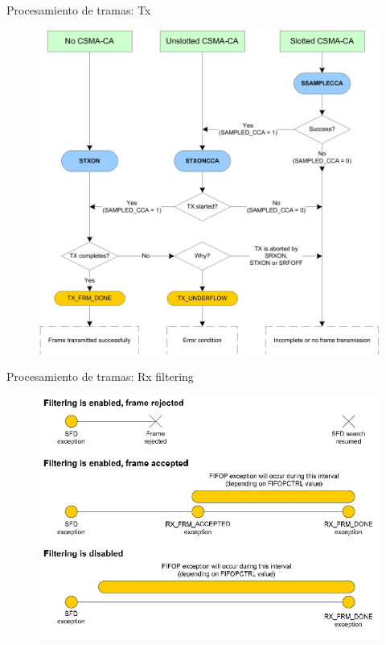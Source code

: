 \documentclass[aspectratio=169, handout]{beamer}
\begin{document}
\begin{frame}{Procesamiento de tramas: Tx}
	\begin{figure}[H]
		\includegraphics[height=.95\textheight]{./imagenes/txfifo.jpg}
	\end{figure}	
\end{frame}

\begin{frame}{Procesamiento de tramas: Rx filtering}
	\begin{figure}[H]
		\includegraphics[height=.95\textheight]{./imagenes/filtering.jpg}
	\end{figure}	
\end{frame}
\end{document}
